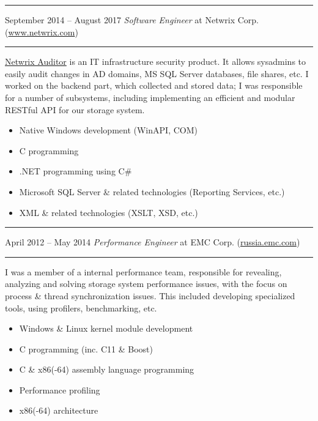 \documentclass[11pt]{article}
\newcommand\CXX{C\nolinebreak[4]\hspace{-.05em}\raisebox{.4ex}{\relsize{-3}{\textbf{++}}}}
\newcommand\CvSmallSkipLength{0.5em}
\newcommand\CvSkip[1]{\vspace{#1}}
\newcommand\CvSmallSkip{\CvSkip{\CvSmallSkipLength}}
\newcommand\CvRule{\begingroup\color{CvRuleColor}\hrule\endgroup}
\newcommand\CvWorkplaceHeader[5]{\begingroup%
  \CvRule\nopagebreak%
  \fboxsep0pt%
  \colorbox{CvWorkplaceHeaderColor}{%
    \begin{minipage}{\linewidth-2\fboxsep}%
\CvSmallSkip%
#1 -- #2 \hfill \textit{#3} at #4 (\href{http://#5/}{#5})%
\CvSmallSkip%
    \end{minipage}%
  }%
  \CvRule%
\endgroup%
}
\newenvironment{CvWorkplaceDescription}{%
    \begingroup\setlength\parskip{\CvSmallSkipLength}%
  }{%
    \CvSmallSkip\endgroup%
  }
\begin{document}
\CvWorkplaceHeader{September 2014}{August 2017}{Software Engineer}{Netwrix Corp.}{www.netwrix.com}

\begin{CvWorkplaceDescription}
\href{https://www.netwrix.com/auditor.html}{Netwrix Auditor} is an IT
infrastructure security product.
It allows sysadmins to easily audit changes in AD domains, MS SQL Server
databases, file shares, etc.
I worked on the backend part, which collected and stored data; I was
responsible for a number of subsystems, including implementing an efficient and
modular RESTful API for our storage system.

\begin{itemize}[noitemsep]
  \item Native Windows development (WinAPI, COM)
  \item {\CXX} programming
  \item .NET programming using C\#
  \item Microsoft SQL Server \& related technologies (Reporting Services,
etc.)
  \item XML \& related technologies (XSLT, XSD, etc.)
\end{itemize}
\end{CvWorkplaceDescription}

\CvWorkplaceHeader{April 2012}{May 2014}{Performance Engineer}{EMC Corp.}{russia.emc.com}

\begin{CvWorkplaceDescription}
I was a member of a internal performance team, responsible for revealing,
analyzing and solving storage system performance issues, with the focus on
process \& thread synchronization issues.
This included developing specialized tools, using profilers, benchmarking, etc.

\begin{itemize}[noitemsep]
  \item Windows \& Linux kernel module development
  \item {\CXX} programming (inc. {\CXX}11 \& Boost)
  \item C \& x86(-64) assembly language programming
  \item Performance profiling
  \item x86(-64) architecture
\end{itemize}
\end{CvWorkplaceDescription}
\end{document}

